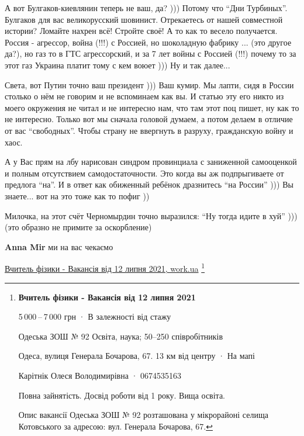 \begin{itemize}
\begin{itemize}
А вот Булгаков-киевлянин теперь не ваш, да? ))) Потому что \enquote{Дни Турбиных}.
Булгаков для вас великорусский шовинист. Отрекаетесь от нашей совместной
истории? Ломайте нахрен всё! Стройте своё! А то как то весело получается.
Россия - агрессор, война (!!!) с Россией, но шоколадную фабрику ... (это другое
да?), но газ то в ГТС агрессорский, и за 7 лет войны с Россией (!!!) почему то
за этот газ Украина платит тому с кем воюет ))) Ну и так далее...

Света, вот Путин точно ваш президент ))) Ваш кумир. Мы лапти, сидя в России
столько о нём не говорим и не вспоминаем как вы. И статью эту его никто из
моего окружения не читал и не интересно нам, что там этот поц пишет, ну как то
не интересно. Только вот мы сначала головой думаем, а потом делаем в отличие от
вас \enquote{свободных}. Чтобы страну не ввергнуть в разруху, гражданскую войну и хаос.

А у Вас прям на лбу нарисован синдром провинциала с заниженной самооценкой и
полным отсутствием самодостаточности. Это когда вы аж подпрыгиваете от предлога
\enquote{на}. И в ответ как обиженный ребёнок дразнитесь \enquote{на России} ))) Вы знаете...
вот на это тоже как то пофиг ))

Милочка, на этот счёт Черномырдин точно выразился: \enquote{Ну тогда идите в хуй} )))
(это образно не примите за оскорбление) \Laughey[1.0][white]

 
\textbf{Anna Mir} ми на вас чекаємо 

\href{https://www.work.ua/jobs/3970487/}{Вчитель фізики - Вакансія від 12 липня 2021, work.ua}
\footnote{
{\bfseries Вчитель фізики - Вакансія від 12 липня 2021}

5 000 – 7 000 грн · В залежності від стажу

Одеська ЗОШ № 92 
Освіта, наука; 50–250 співробітників

Одеса, вулиця Генерала Бочарова, 67.
13 км від центру · На мапі

Карітнік Олеся Володимирівна · 0674535163 

Повна зайнятість. Досвід роботи від 1 року. Вища освіта.

Опис вакансії
Одеська ЗОШ № 92 розташована у мікрорайоні селища Котовського за адресою: вул. Генерала Бочарова, 67.

}
\end{itemize}
\end{itemize}
